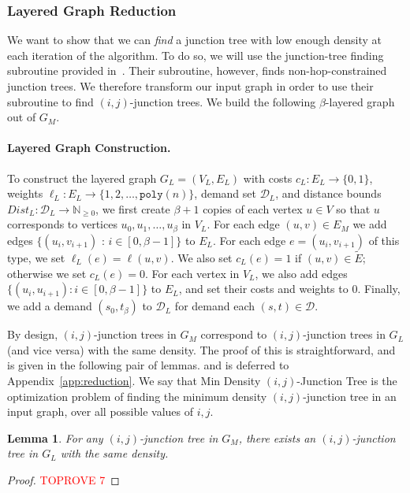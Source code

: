 \documentclass{article}
\newtheorem{lemma}[theorem]{Lemma}
\theoremstyle{definition}
\theoremstyle{remark}
\def\jt {{\sc Min Density $(i,j)$-Junction Tree}}
\begin{document}
\subsubsection{Layered Graph Reduction} \label{sec:layered_reduction}
We want to show that we can \textit{find} a junction tree with low enough density at each iteration of the algorithm. To do so, we will use the junction-tree finding subroutine provided in~\cite{GKL23}. Their subroutine, however, finds non-hop-constrained junction trees. We therefore transform our input graph in order to use their subroutine to find $(i,j)$-junction trees. We build the following $\beta$-layered graph out of $G_M$. 

\paragraph{Layered Graph Construction.} To construct the layered graph $G_L = (V_L, E_L)$ with costs $c_L : E_L \rightarrow \{0,1\}$, weights $\ell_L : E_L \rightarrow \{1, 2, \dots, \texttt{poly}(n) \}$, demand set $\mathcal{D}_L$, and distance bounds $Dist_L : \mathcal{D}_L \rightarrow \mathbb{N}_{\geq 0}$, 
we first create $\beta + 1$ copies of each vertex $u \in V$ so that $u$ corresponds to vertices $u_0, u_1, \dots, u_{\beta}$ in $V_L$.
For each edge $(u,v) \in E_M$ we add edges $\{ (u_i, v_{i+1})$ : $i \in [0, \beta-1] \}$ to $E_L$. 
For each edge $e = (u_i, v_{i+1})$ of this type, we set $\ell_{L}(e) = \ell(u,v)$. We also set $c_{L}(e) = 1$ if $(u,v) \in \widetilde{E}$; otherwise we set $c_{L}(e) = 0$.  
For each vertex in $V_L$, we also add edges $\{ (u_i, u_{i+1}) : i \in [0, \beta-1]  \}$ to $E_L$, and set their costs and weights to $0$. 
Finally, we add a demand $(s_0, t_\beta)$ to $\mathcal{D}_L$ for demand each $(s,t) \in \mathcal{D}$.


By design, $(i,j)$-junction trees in $G_M$ correspond to $(i,j)$-junction trees in $G_L$ (and vice versa) with the same density. The proof of this is straightforward, \iflong and is given in the following pair of lemmas. \else and is deferred to Appendix~\ref{app:reduction}. We say that {\jt} is the optimization problem of finding the minimum density $(i,j)$-junction tree in an input graph, over all possible values of $i,j$. \fi

\iflong
\begin{lemma}
\label{cl:input_to_layered}
    For any $(i,j)$-junction tree in $G_M$, there exists an $(i,j)$-junction tree in $G_L$ with the same density. 
\end{lemma}
\begin{proof}\textcolor{red}{TOPROVE 7}\end{proof}
\end{document}

